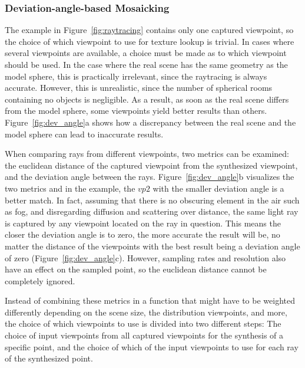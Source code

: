 

\subsubsection{Deviation-angle-based Mosaicking}
The example in Figure~\ref{fig:raytracing} contains only one captured viewpoint, so the choice of which viewpoint to use for texture lookup is trivial. In cases where several viewpoints are available, a choice must be made as to which viewpoint should be used. In the case where the real scene has the same geometry as the model sphere, this is practically irrelevant, since the raytracing is always accurate. However, this is unrealistic, since the number of spherical rooms containing no objects is negligible. As a result, as soon as the real scene differs from the model sphere, some viewpoints yield better results than others. Figure~\ref{fig:dev_angle}a shows how a discrepancy between the real scene and the model sphere can lead to inaccurate results.

When comparing rays from different viewpoints, two metrics can be examined: the euclidean distance of the captured viewpoint from the synthesized viewpoint, and the deviation angle between the rays. Figure~\ref{fig:dev_angle}b visualizes the two metrics and in the example, the $vp2$ with the smaller deviation angle is a better match. In fact, assuming that there is no obscuring element in the air such as fog, and disregarding diffusion and scattering over distance, the same light ray is captured by any viewpoint located on the ray in question. This means the closer the deviation angle is to zero, the more accurate the result will be, no matter the distance of the viewpoints with the best result being a deviation angle of zero (Figure~\ref{fig:dev_angle}c). However, sampling rates and resolution also have an effect on the sampled point, so the euclidean distance cannot be completely ignored.

Instead of combining these metrics in a function that might have to be weighted differently depending on the scene size, the distribution viewpoints, and more, the choice of which viewpoints to use is divided into two different steps: The choice of input viewpoints from all captured viewpoints for the synthesis of a specific point, and the choice of which of the input viewpoints to use for each ray of the synthesized point. 

